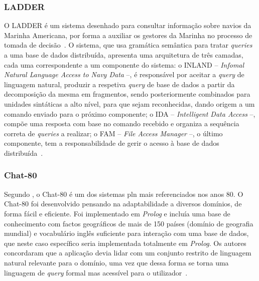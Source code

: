 \subsubsection*{LADDER}
O LADDER é um sistema desenhado para consultar informação sobre navios da Marinha Americana, por forma a auxiliar os gestores da Marinha no processo de tomada de decisão~\parencite{nlidb_brief_review, developing_nli_complex_data}. O sistema, que usa gramática semântica para tratar \textit{queries} a uma base de dados distribuída, apresenta uma arquitetura de três camadas, cada uma correspondente a um componente do sistema: o INLAND -- \textit{Infomal Natural Language Access to Navy Data} --, é responsável por aceitar a \textit{query} de linguagem natural, produzir a respetiva \textit{query} de base de dados a partir da decomposição da mesma em fragmentos, sendo posteriormente combinados para unidades sintáticas a alto nível, para que sejam reconhecidas, dando origem a um comando enviado para o próximo componente; o IDA -- \textit{Intelligent Data Access} --, compõe uma resposta com base no comando recebido e organiza a sequência correta de \textit{queries} a realizar; o FAM -- \textit{File Access Manager} --, o último componente, tem a responsabilidade de gerir o acesso à base de dados distribuída~\parencite{developing_nli_complex_data}.

\subsubsection*{Chat-80}
Segundo \textcite{nlidb_brief_review}, o Chat-80 é um dos sistemas \gls{pln} mais referenciados nos anos 80. O Chat-80 foi desenvolvido pensando na adaptabilidade a diversos domínios, de forma fácil e eficiente. Foi implementado em \textit{Prolog} e incluía uma base de conhecimento com factos geográficos de mais de 150 países (domínio de geografia mundial) e vocabulário inglês suficiente para interação com uma base de dados, que neste caso específico seria implementada totalmente em \textit{Prolog}. Os autores concordaram que a aplicação devia lidar com um conjunto restrito de linguagem natural relevante para o domínio, uma vez que dessa forma se torna uma linguagem de \textit{query} formal mas acessível para o utilizador~\parencite{efficient_easily_adaptable_system_interpreting_nlq}.

